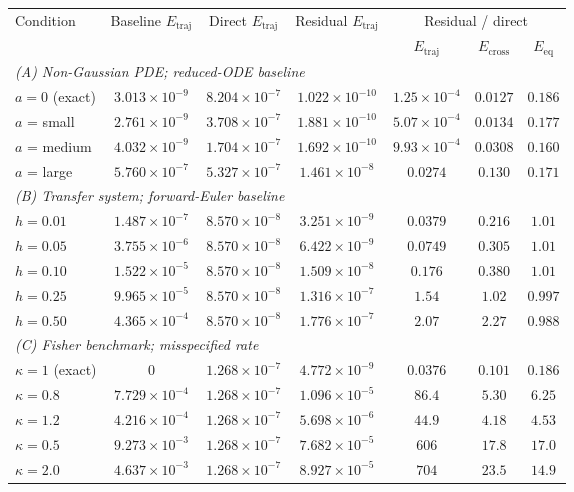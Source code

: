 \begin{tabular}{lcccccc}
\toprule
Condition & Baseline $E_{\mathrm{traj}}$ & Direct $E_{\mathrm{traj}}$ & Residual $E_{\mathrm{traj}}$ & \multicolumn{3}{c}{Residual / direct} \\
\cmidrule(lr){5-7}
 & & & & $E_{\mathrm{traj}}$ & $E_{\mathrm{cross}}$ & $E_{\mathrm{eq}}$ \\
\midrule
\multicolumn{7}{l}{\textit{(A) Non-Gaussian PDE; reduced-ODE baseline}} \\
$a=0$ (exact) & $3.013{\times}10^{-9}$ & $8.204{\times}10^{-7}$ & $1.022{\times}10^{-10}$ & $1.25{\times}10^{-4}$ & $0.0127$ & $0.186$ \\
$a$ = small & $2.761{\times}10^{-9}$ & $3.708{\times}10^{-7}$ & $1.881{\times}10^{-10}$ & $5.07{\times}10^{-4}$ & $0.0134$ & $0.177$ \\
$a$ = medium & $4.032{\times}10^{-9}$ & $1.704{\times}10^{-7}$ & $1.692{\times}10^{-10}$ & $9.93{\times}10^{-4}$ & $0.0308$ & $0.160$ \\
$a$ = large & $5.760{\times}10^{-7}$ & $5.327{\times}10^{-7}$ & $1.461{\times}10^{-8}$ & $0.0274$ & $0.130$ & $0.171$ \\
\midrule
\multicolumn{7}{l}{\textit{(B) Transfer system; forward-Euler baseline}} \\
$h=0.01$ & $1.487{\times}10^{-7}$ & $8.570{\times}10^{-8}$ & $3.251{\times}10^{-9}$ & $0.0379$ & $0.216$ & $1.01$ \\
$h=0.05$ & $3.755{\times}10^{-6}$ & $8.570{\times}10^{-8}$ & $6.422{\times}10^{-9}$ & $0.0749$ & $0.305$ & $1.01$ \\
$h=0.10$ & $1.522{\times}10^{-5}$ & $8.570{\times}10^{-8}$ & $1.509{\times}10^{-8}$ & $0.176$ & $0.380$ & $1.01$ \\
$h=0.25$ & $9.965{\times}10^{-5}$ & $8.570{\times}10^{-8}$ & $1.316{\times}10^{-7}$ & $1.54$ & $1.02$ & $0.997$ \\
$h=0.50$ & $4.365{\times}10^{-4}$ & $8.570{\times}10^{-8}$ & $1.776{\times}10^{-7}$ & $2.07$ & $2.27$ & $0.988$ \\
\midrule
\multicolumn{7}{l}{\textit{(C) Fisher benchmark; misspecified rate}} \\
$\kappa=1$ (exact) & $0$ & $1.268{\times}10^{-7}$ & $4.772{\times}10^{-9}$ & $0.0376$ & $0.101$ & $0.186$ \\
$\kappa=0.8$ & $7.729{\times}10^{-4}$ & $1.268{\times}10^{-7}$ & $1.096{\times}10^{-5}$ & $86.4$ & $5.30$ & $6.25$ \\
$\kappa=1.2$ & $4.216{\times}10^{-4}$ & $1.268{\times}10^{-7}$ & $5.698{\times}10^{-6}$ & $44.9$ & $4.18$ & $4.53$ \\
$\kappa=0.5$ & $9.273{\times}10^{-3}$ & $1.268{\times}10^{-7}$ & $7.682{\times}10^{-5}$ & $606$ & $17.8$ & $17.0$ \\
$\kappa=2.0$ & $4.637{\times}10^{-3}$ & $1.268{\times}10^{-7}$ & $8.927{\times}10^{-5}$ & $704$ & $23.5$ & $14.9$ \\
\bottomrule
\end{tabular}
